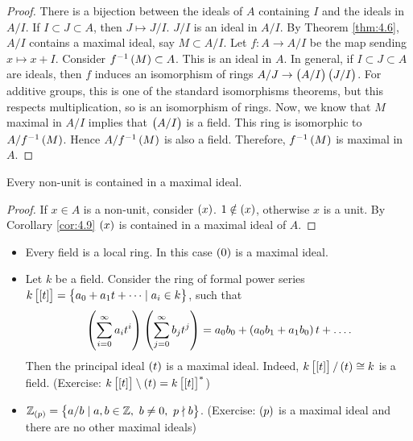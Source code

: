 \begin{proof}
There is a bijection between the ideals of $ A $ containing $ I $ and the ideals in $ A / I $. If $ I \subset J \subset A $, then $ J \mapsto J / I $. $ J / I $ is an ideal in $ A / I $. By Theorem \ref{thm:4.6}, $ A / I $ contains a maximal ideal, say $ M \subset A / I $. Let $ f : A \to A / I $ be the map sending $ x \mapsto x + I $. Consider $ f^{-1}\br{M} \subset A $. This is an ideal in $ A $. In general, if $ I \subset J \subset A $ are ideals, then $ f $ induces an isomorphism of rings $ A / J \to \br{A / I}\br{J / I} $. For additive groups, this is one of the standard isomorphisms theorems, but this respects multiplication, so is an isomorphism of rings. Now, we know that $ M $ maximal in $ A / I $ implies that $ \br{A / I} $ is a field. This ring is isomorphic to $ A / f^{-1}\br{M} $. Hence $ A / f^{-1}\br{M} $ is also a field. Therefore, $ f^{-1}\br{M} $ is maximal in $ A $.
\end{proof}

\begin{corollary}
\label{cor:4.10}
Every non-unit is contained in a maximal ideal.
\end{corollary}

\begin{proof}
If $ x \in A $ is a non-unit, consider $ \br{x} $. $ 1 \notin \br{x} $, otherwise $ x $ is a unit. By Corollary \ref{cor:4.9} $ \br{x} $ is contained in a maximal ideal of $ A $.
\end{proof}

\begin{example*}
\hfill
\begin{itemize}
\item Every field is a local ring. In this case $ \br{0} $ is a maximal ideal.
\item Let $ k $ be a field. Consider the ring of formal power series $ k\sbr{\sbr{t}} = \cbr{a_0 + a_1t + \dots \mid a_i \in k} $, such that
$$ \br{\sum_{i = 0}^\infty a_it^i}\br{\sum_{j = 0}^\infty b_jt^j} = a_0b_0 + \br{a_0b_1 + a_1b_0}t + \dots. $$
Then the principal ideal $ \br{t} $ is a maximal ideal. Indeed, $ k\sbr{\sbr{t}} / \br{t} \cong k $ is a field. (Exercise: $ k\sbr{\sbr{t}} \setminus \br{t} = k\sbr{\sbr{t}}^* $)
\item $ \Z_{\br{p}} = \cbr{a / b \mid a, b \in \Z, \ b \ne 0, \ p \nmid b} $. (Exercise: $ \br{p} $ is a maximal ideal and there are no other maximal ideals)
\end{itemize}
\end{example*}


